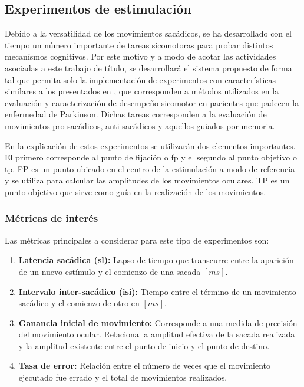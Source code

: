 \documentclass[../Main.tex]{subfiles}
\begin{document}
		\subsection{Experimentos de estimulación}
		\label{sub:02_experimentos_de_estimulacion}
			Debido a la versatilidad de los movimientos sacádicos, se ha desarrollado con el tiempo un número importante de tareas sicomotoras para probar distintos mecanísmos cognitivos. Por este motivo y a modo de acotar las actividades asociadas a este trabajo de título, se desarrollará el sistema propuesto de forma tal que permita solo la implementación de experimentos con características similares a los presentados en \cite{article:tests_1, article:tests_2, article:tests_3, article:tests_4, article:tests_5}, que corresponden a métodos utilizados en la evaluación y caracterización de desempeño sicomotor en pacientes que padecen la enfermedad de Parkinson. Dichas tareas corresponden a la evaluación de movimientos pro-sacádicos, anti-sacádicos y aquellos guiados por memoria.

			En la explicación de estos experimentos se utilizarán dos elementos importantes. El primero corresponde al punto de fijación o \acrshort{fp} y el segundo al punto objetivo o \acrshort{tp}. FP es un punto ubicado en el centro de la estimulación a modo de referencia y se utiliza para calcular las amplitudes de los movimientos oculares. TP es un punto objetivo que sirve como guía en la realización de los movimientos. 

			\vspace{-5mm}
			\subsubsection{Métricas de interés}
			\label{ssub:metricas_de_interes}
				Las métricas principales a considerar para este tipo de experimentos son:
				\begin{enumerate}\setlength\itemsep{-0.5em}
				 	\item \textbf{Latencia sacádica (\acrshort{sl}):} Lapso de tiempo que transcurre entre la aparición de un nuevo estímulo y el comienzo de una sacada $[ms]$. 

				 	\item \textbf{Intervalo inter-sacádico (\acrshort{isi}):} Tiempo entre el término de un movimiento sacádico y el comienzo de otro en $[ms]$.
				 	
				 	\item \textbf{Ganancia inicial de movimiento:} Corresponde  a una medida de precisión del movimiento ocular. Relaciona la amplitud efectiva de la sacada realizada y la amplitud existente entre el punto de inicio y el punto de destino.   
				 	
				 	\item \textbf{Tasa de error:} Relación entre el número de veces que el movimiento ejecutado fue errado y el total de movimientos realizados. 

				 \end{enumerate} 
\end{document}
